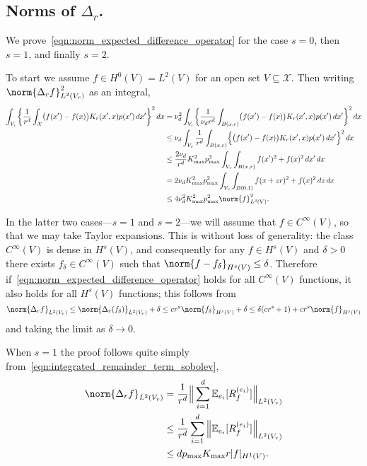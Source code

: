 \documentclass{article}
\newcommand{\1}{\mathbf{1}}
\newcommand{\Xset}{\mathcal{X}}
\newcommand{\Leb}{L}
\newcommand{\Ebb}{\mathbb{E}}
\theoremstyle{alden}
\theoremstyle{aldenthm}
\theoremstyle{definition}
\theoremstyle{remark}
\begin{document}
\subsection{Norms of $\Delta_r$.}
\label{subsec:proof_boundedness_expected_difference_operator}

We prove~\eqref{eqn:norm_expected_difference_operator} for the case $s = 0$, then $s = 1$, and finally $s = 2$.

To start we assume $f \in H^0(V) = \Leb^2(V)$ for an open set $V \subseteq \Xset$. Then writing $\norm{\Delta_rf}_{\Leb^2(V_r)}^2$ as an integral,  
\begin{align*}
\int_{V_r} \biggl\{\frac{1}{r^d} \int_{\Xset} \bigl(f(x') - f(x)\bigr) K_r(x',x) p(x') \,dx'\biggr\}^2 \,dx & = \nu_d^2 \int_{V_r} \biggl\{\frac{1}{\nu_d r^d} \int_{B(x,r)} \bigl(f(x') - f(x)\bigr) K_r(x',x) p(x') \,dx'\biggr\}^2 \,dx \\
& \leq \nu_d \int_{V_r} \frac{1}{r^d} \int_{B(x,r)} \Bigl\{\bigl(f(x') - f(x)\bigr) K_r(x',x) p(x') \,dx'\Bigr\}^2 \,dx \\
& \leq \frac{2 \nu_d }{r^d} K_{\max}^2 p_{\max}^2 \int_{V_r} \int_{B(x,r)} f(x')^2 + f(x)^2 \,dx' \,dx \\
& = 2 \nu_d K_{\max}^2 p_{\max}^2 \int_{V_r} \int_{B(0,1)} f(x + zr)^2 + f(x)^2 \,dz \,dx \\
& \leq 4 \nu_d^2 K_{\max}^2 p_{\max}^2 \norm{f}_{\Leb^2(V)}^2.
\end{align*}

In the latter two cases---$s = 1$ and $s = 2$---we will assume that $f \in C^{\infty}(V)$, so that we may take Taylor expansions. This is without loss of generality: the class $C^{\infty}(V)$ is dense in $H^s(V)$, and consequently for any $f \in H^s(V)$ and $\delta > 0$ there exists $f_{\delta} \in C^{\infty}(V)$ such that $\norm{f - f_{\delta}}_{H^s(V)} \leq \delta$. Therefore if~\eqref{eqn:norm_expected_difference_operator} holds for all $C^{\infty}(V)$ functions, it also holds for all $H^s(V)$ functions; this follows from
\begin{equation*}
\norm{\Delta_rf}_{\Leb^2(V_r)} \leq \norm{\Delta_r(f_{\delta})}_{\Leb^2(V_r)} + \delta \leq cr^s \norm{f_{\delta}}_{H^s(V)} + \delta \leq \delta(cr^s + 1) + cr^s\norm{f}_{H^s(V)}
\end{equation*}
and taking the limit as $\delta \to 0$.

When $s = 1$ the proof follows quite simply from~\eqref{eqn:integrated_remainder_term_sobolev},
\begin{align*}
\norm{\Delta_rf}_{\Leb^2(V_r)} & = \frac{1}{r^d}\Big\|\sum_{i = 1}^d \Ebb_{e_i}[R_f^{(e_i)}]\Bigr\|_{\Leb^2(V_r)} \\
& \leq \frac{1}{r^d}\sum_{i = 1}^{d} \Big\| \Ebb_{e_i}[R_f^{(e_i)}]\Bigr\|_{\Leb^2(V_r)} \\
& \leq d p_{\max} K_{\max} r |f|_{H^1(V)}.
\end{align*}
\end{document}
